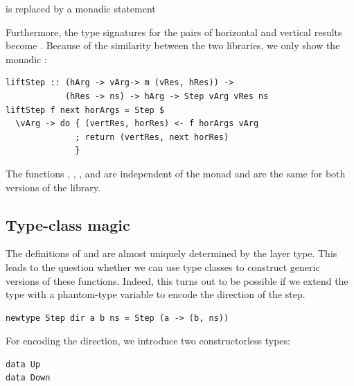 \documentclass[preprint,natbib]{sigplanconf}
\begin{document}

is replaced by a monadic statement


Furthermore, the type signatures for the pairs of horizontal and vertical results  become . Because of the similarity between the two libraries, we only show the monadic :

\begin{small}
\begin{verbatim}
liftStep :: (hArg -> vArg-> m (vRes, hRes)) -> 
            (hRes -> ns) -> hArg -> Step vArg vRes ns
liftStep f next horArgs = Step $ 
  \vArg -> do { (vertRes, horRes) <- f horArgs vArg
              ; return (vertRes, next horRes)
              }
\end{verbatim}
\end{small}%

The functions , , , and  are independent of the monad and are the same for both versions of the library. 



%																
%																
%																
\subsection{Type-class magic} \label{sect:typeClass}

The definitions of  and  are almost uniquely determined by the layer type. This leads to the question whether we can use type classes to construct generic versions of these functions. Indeed, this turns out to be possible if we extend the  type with a phantom-type variable to encode the direction of the step. 

\begin{small}
\begin{verbatim}
newtype Step dir a b ns = Step (a -> (b, ns))
\end{verbatim}
\end{small}

For encoding the direction, we introduce two constructorless types:

\begin{small}
\begin{verbatim}
data Up 
data Down 
\end{verbatim}
\end{small}
\end{document}
